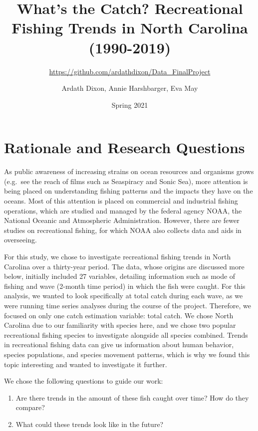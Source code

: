\documentclass[
  12pt,
]{article}
\title{What's the Catch? Recreational Fishing Trends in North Carolina
(1990-2019)}
\subtitle{\url{https://github.com/ardathdixon/Data_FinalProject}}
\author{Ardath Dixon, Annie Harshbarger, Eva May}
\date{Spring 2021}
\begin{document}
\maketitle

\newpage
\tableofcontents 
\newpage
\listoftables 
\newpage
\listoffigures 
\newpage

\hypertarget{rationale-and-research-questions}{%
\section{Rationale and Research
Questions}\label{rationale-and-research-questions}}

As public awareness of increasing strains on ocean resources and
organisms grows (e.g.~see the reach of films such as Seaspiracy and
Sonic Sea), more attention is being placed on understanding fishing
patterns and the impacts they have on the oceans. Most of this attention
is placed on commercial and industrial fishing operations, which are
studied and managed by the federal agency NOAA, the National Oceanic and
Atmospheric Administration. However, there are fewer studies on
recreational fishing, for which NOAA also collects data and aids in
overseeing.

For this study, we chose to investigate recreational fishing trends in
North Carolina over a thirty-year period. The data, whose origins are
discussed more below, initially included 27 variables, detailing
information such as mode of fishing and wave (2-month time period) in
which the fish were caught. For this analysis, we wanted to look
specifically at total catch during each wave, as we were running time
series analyses during the course of the project. Therefore, we focused
on only one catch estimation variable: total catch. We chose North
Carolina due to our familiarity with species here, and we chose two
popular recreational fishing species to investigate alongside all
species combined. Trends in recreational fishing data can give us
information about human behavior, species populations, and species
movement patterns, which is why we found this topic interesting and
wanted to investigate it further.

We chose the following questions to guide our work:

\begin{enumerate}
\def\labelenumi{\arabic{enumi}.}
\item
  Are there trends in the amount of these fish caught over time? How do
  they compare?
\item
  What could these trends look like in the future?
\end{enumerate}
\end{document}
